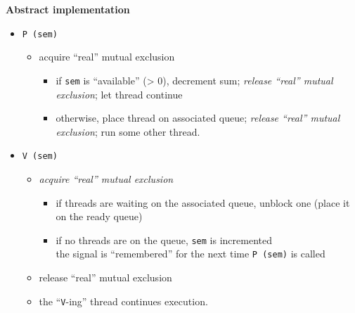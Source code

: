 \documentclass[11pt,a4paper]{article}
\begin{document}
\textbf{Abstract implementation}
\begin{itemize}
    \item \texttt{P\,(sem)}
        \begin{itemize}
            \item acquire ``real'' mutual exclusion
                \begin{itemize}
                    \item if \texttt{sem} is ``available'' (> 0), decrement sum;
                        \emph{release ``real'' mutual exclusion};
                        let thread continue
                    \item otherwise,  place thread on associated queue;
                        \emph{release ``real'' mutual exclusion};
                        run some other thread.
                \end{itemize}
        \end{itemize}
\item \texttt{V\,(sem)}
    \begin{itemize}
        \item \emph{acquire ``real'' mutual exclusion}
            \begin{itemize}
                \item if threads are waiting on the associated queue,
                    unblock one (place it on the ready queue)
                \item if no threads are on the queue, \texttt{sem} is incremented \\
                    the signal is ``remembered'' for the next time \texttt{P\,(sem)} is called
            \end{itemize}
        \item release ``real'' mutual exclusion
        \item the ``\texttt{V}-ing'' thread continues execution.
    \end{itemize}
\end{itemize}
\end{document}
